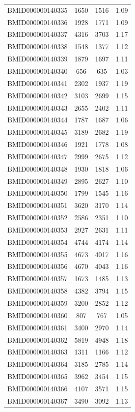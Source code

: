 \documentclass{bmcart}
\begin{document}
\begin{backmatter}
\begin{center}
\begin{longtable}{c|c|c|c}
BMID000000140335 & 1650 & 1516 & 1.09 \\
BMID000000140336 & 1928 & 1771 & 1.09 \\
BMID000000140337 & 4316 & 3703 & 1.17 \\
BMID000000140338 & 1548 & 1377 & 1.12 \\
BMID000000140339 & 1879 & 1697 & 1.11 \\
BMID000000140340 & 656 & 635 & 1.03 \\
BMID000000140341 & 2302 & 1937 & 1.19 \\
BMID000000140342 & 3103 & 2699 & 1.15 \\
BMID000000140343 & 2655 & 2402 & 1.11 \\
BMID000000140344 & 1787 & 1687 & 1.06 \\
BMID000000140345 & 3189 & 2682 & 1.19 \\
BMID000000140346 & 1921 & 1778 & 1.08 \\
BMID000000140347 & 2999 & 2675 & 1.12 \\
BMID000000140348 & 1930 & 1818 & 1.06 \\
BMID000000140349 & 2895 & 2627 & 1.10\\
BMID000000140350 & 1799 & 1545 & 1.16 \\
BMID000000140351 & 3620 & 3170 & 1.14 \\
BMID000000140352 & 2586 & 2351 & 1.10\\
BMID000000140353 & 2927 & 2631 & 1.11 \\
BMID000000140354 & 4744 & 4174 & 1.14 \\
BMID000000140355 & 4673 & 4017 & 1.16 \\
BMID000000140356 & 4670 & 4043 & 1.16 \\
BMID000000140357 & 1673 & 1485 & 1.13 \\
BMID000000140358 & 4382 & 3794 & 1.15 \\
BMID000000140359 & 3200 & 2852 & 1.12 \\
BMID000000140360 & 807 & 767 & 1.05 \\
BMID000000140361 & 3400 & 2970 & 1.14 \\
BMID000000140362 & 5819 & 4948 & 1.18 \\
BMID000000140363 & 1311 & 1166 & 1.12 \\
BMID000000140364 & 3185 & 2785 & 1.14 \\
BMID000000140365 & 3962 & 3454 & 1.15 \\
BMID000000140366 & 4107 & 3571 & 1.15 \\
BMID000000140367 & 3490 & 3092 & 1.13 \\

\end{longtable}
\end{center}
\end{backmatter}
\end{document}
